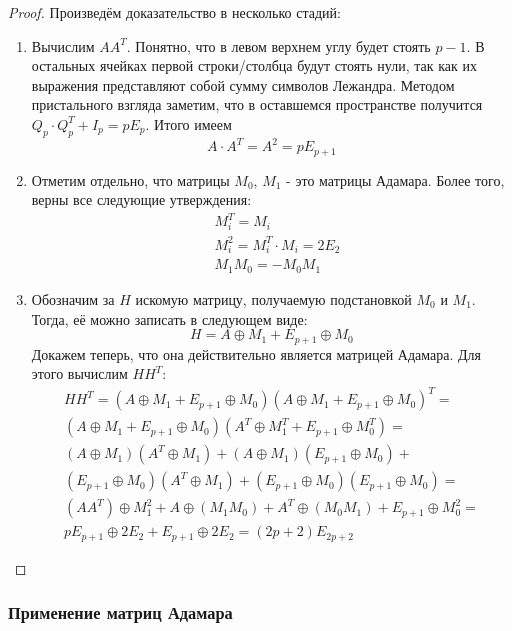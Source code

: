 \begin{proof}
	Произведём доказательство в несколько стадий:
	\begin{enumerate}
		\item Вычислим $AA^T$. Понятно, что в левом верхнем углу будет стоять $p - 1$. В остальных ячейках первой строки/столбца будут стоять нули, так как их выражения представляют собой сумму символов Лежандра. Методом пристального взгляда заметим, что в оставшемся пространстве получится $Q_p \cdot Q^T_p + I_p = pE_p$. Итого имеем
		\[
			A \cdot A^T = A^2 = pE_{p + 1}
		\]
		
		\item Отметим отдельно, что матрицы $M_0$, $M_1$ - это матрицы Адамара. Более того, верны все следующие утверждения:
		\begin{align*}
			&{M_i^T = M_i}
			\\
			&{M_i^2 = M_i^T \cdot M_i = 2E_2}
			\\
			&{M_1 M_0 = - M_0 M_1}
		\end{align*}
		
		\item Обозначим за $H$ искомую матрицу, получаемую подстановкой $M_0$ и $M_1$. Тогда, её можно записать в следующем виде:
		\[
			H = A \oplus M_1 + E_{p + 1} \oplus M_0
		\]
		Докажем теперь, что она действительно является матрицей Адамара. Для этого вычислим $HH^T$:
		\begin{multline*}
			HH^T = (A \oplus M_1 + E_{p + 1} \oplus M_0)(A \oplus M_1 + E_{p + 1} \oplus M_0)^T =
			\\
			(A \oplus M_1 + E_{p + 1} \oplus M_0)(A^T \oplus M_1^T + E_{p + 1} \oplus M_0^T) =
			\\
			(A \oplus M_1)(A^T \oplus M_1) + (A \oplus M_1)(E_{p + 1} \oplus M_0) +
			\\
			(E_{p + 1} \oplus M_0)(A^T \oplus M_1) + (E_{p + 1} \oplus M_0)(E_{p + 1} \oplus M_0) =
			\\
			(AA^T) \oplus M_1^2 + A \oplus (M_1 M_0) + A^T \oplus (M_0 M_1) + E_{p + 1} \oplus M_0^2 =
			\\
			pE_{p + 1} \oplus 2E_2 + E_{p + 1} \oplus 2E_2 = (2p + 2)E_{2p + 2}
		\end{multline*}
	\end{enumerate}
\end{proof}

\subsubsection*{Применение матриц Адамара}

